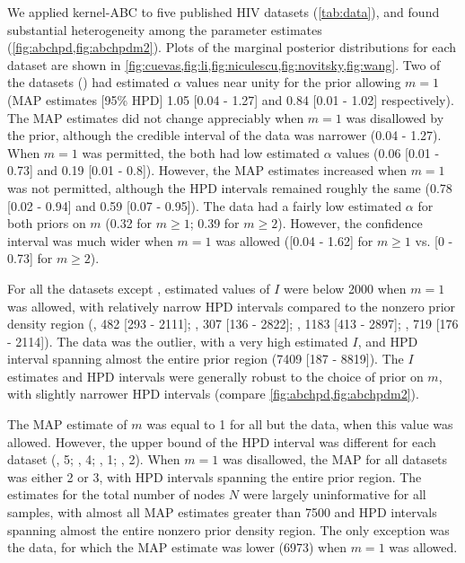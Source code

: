 We applied kernel-ABC to five published HIV datasets (\cref{tab:data}),
and found substantial heterogeneity among the parameter estimates
(\cref{fig:abchpd,fig:abchpdm2}). Plots of the marginal posterior distributions
for each dataset are shown in
\cref{fig:cuevas,fig:li,fig:niculescu,fig:novitsky,fig:wang}.
Two of the datasets (\textcite{niculescu2015recent, wang2015targeting}) had
estimated $\alpha$ values near unity for the prior allowing $m = 1$ (\gls{MAP}
estimates [95\% \gls{HPD}] 
  1.05 
  [0.04 - 
   1.27]
and
  0.84 
  [0.01 -
   1.02] respectively).
The MAP estimates did not change appreciably when $m = 1$ was disallowed by the
prior, although the credible interval of the \textcite{niculescu2015recent}
data was narrower
  (0.04 - 
   1.27).
When $m = 1$ was permitted, the \textcite{li2015hiv, cuevas2009hiv} both had
low estimated $\alpha$ values
  (0.06 
  [0.01 - 
  0.73]
and
  0.19 
  [0.01 -
   0.8]). 
However, the MAP estimates increased when $m = 1$ was not permitted, although
the HPD intervals remained roughly the same
  (0.78 
  [0.02 - 
  0.94]
and
  0.59 
  [0.07 -
   0.95]).
The \textcite{novitsky2014impact} data had a fairly low estimated $\alpha$
for both priors on $m$
  (0.32 for $m \geq 1$;
   0.39 for $m \geq 2$).
However, the confidence interval was much wider when $m = 1$ was allowed
  ([0.04 -
    1.62] for $m \geq 1$ vs.
   [0 -
    0.73] for $m \geq 2$).

For all the datasets except \citeauthor{novitsky2014impact}, estimated values
of $I$ were below 2000 when $m = 1$ was allowed, with relatively narrow HPD
intervals compared to the nonzero prior density region
  (\citeauthor{cuevas2009hiv}, 482 
  [293 -
   2111];
   \citeauthor{niculescu2015recent}, 307
  [136 - 
   2822];
  \citeauthor{li2015hiv}, 1183 
  [413 -
   2897];
   \citeauthor{wang2015targeting}, 719
  [176 - 
   2114]).
The \citeauthor{novitsky2014impact} data was the outlier, with a very high
estimated $I$, and HPD interval spanning almost the entire prior region
  (7409 
  [187 -
   8819]).
The $I$ estimates and HPD intervals were generally robust to the choice of
prior on $m$, with slightly narrower HPD intervals (compare
\cref{fig:abchpd,fig:abchpdm2}).

The MAP estimate of $m$ was equal to 1 for all but the
\citeauthor{novitsky2014impact} data, when this value was allowed. However, the
upper bound of the HPD interval was different for each dataset
  (\citeauthor{niculescu2015recent}, 5;
   \citeauthor{wang2015targeting}, 4;
   \citeauthor{li2015hiv}, 1;
   \citeauthor{cuevas2009hiv}, 2).
When $m = 1$ was disallowed, the MAP for all datasets was either 2 or 3, with
HPD intervals spanning the entire prior region. The estimates for the total
number of nodes $N$ were largely uninformative for all samples, with almost all
MAP estimates greater than 7500 and HPD intervals spanning almost the entire
nonzero prior density region. The only exception was the \citeauthor{li2015hiv}
data, for which the MAP estimate was lower 
  (6973)
when $m = 1$ was allowed.

